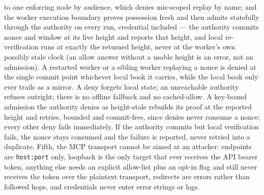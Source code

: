 \documentclass{article}
\begin{document}
to one enforcing node by audience, which denies mis-scoped replay by name;
and the worker execution boundary proves possession fresh and then admits
statefully through the authority on every run, credential included --- the
authority commits nonce and window at its live height and reports that
height, and local re-verification runs at exactly the returned height, never
at the worker's own possibly stale clock (an allow answer without a usable
height is an error, not an admission). A restarted worker or a sibling worker
replaying a nonce is denied at the single commit point whichever local book
it carries, while the local book only ever trails as a mirror. A deny forgets
local state; an unreachable authority refuses outright; there is no offline
fallback and no cached-allow. A key-bound admission the authority denies as
height-stale rebuilds its proof at the reported height and retries, bounded
and commit-free, since denies never consume a nonce; every other deny fails
immediately. If the authority commits but local verification fails, the nonce
stays consumed and the failure is reported, never retried into a duplicate.
Fifth, the MCP transport cannot be aimed
at an attacker: endpoints are \texttt{host:port} only, loopback is the only
target that ever receives the API bearer token, anything else needs an
explicit allow-list plus an opt-in flag and still never receives the token
over the plaintext transport, redirects are errors rather than followed hops,
and credentials never enter error strings or logs.
\end{document}
